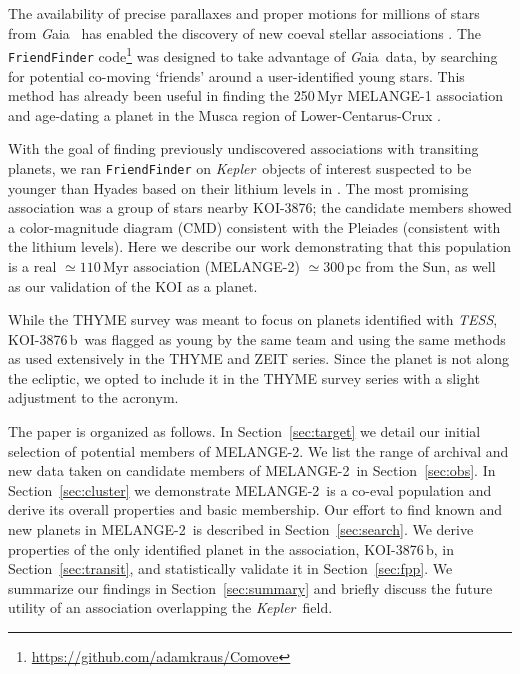\documentclass[twocolumn]{aastex631}
\newcommand{\planetname}{KOI-3876\,b}
\newcommand{\clustername}{MELANGE-2}
\newcommand{\kepler}{{\it Kepler}}
\newcommand{\tess}{\textit{TESS}}
\newcommand{\gaia}{{\textit Gaia}}
\newcommand{\association}{MELANGE-2}
\begin{document}
The availability of precise parallaxes and proper motions for millions of stars from \gaia\ \citep{Gaia_mission2016, GaiaEDR3} has enabled the discovery of new coeval stellar associations \citep[e.g.,][]{2019A&A...622L..13M, 2021arXiv210509338K}. The \texttt{FriendFinder} code\footnote{\url{https://github.com/adamkraus/Comove}} \citep{THYMEV} was designed to take advantage of \gaia\ data, by searching for potential co-moving `friends' around a user-identified young stars. This method has already been useful in finding the 250\,Myr MELANGE-1 association \citep{THYMEV} and age-dating a planet in the Musca region of Lower-Centarus-Crux \citep{2021arXiv211009531M}. 

With the goal of finding previously undiscovered associations with transiting planets, we ran \texttt{FriendFinder} on \kepler\ objects of interest suspected to be younger than Hyades based on their lithium levels in \citet{2018ApJ...855..115B}. The most promising association was a group of stars nearby KOI-3876; the candidate members showed a color-magnitude diagram (CMD) consistent with the Pleiades (consistent with the lithium levels). Here we describe our work demonstrating that this population is a real $\simeq 110$\,Myr association (\association) $\simeq$300\,pc from the Sun, as well as our validation of the KOI as a planet. 

While the THYME survey was meant to focus on planets identified with \tess, \planetname\ was flagged as young by the same team and using the same methods as used extensively in the THYME and ZEIT series. Since the planet is not along the ecliptic, we opted to include it in the THYME survey series with a slight adjustment to the acronym. 

The paper is organized as follows. In Section~\ref{sec:target} we detail our initial selection of potential members of \clustername. We list the range of archival and new data taken on candidate members of \clustername\ in Section~\ref{sec:obs}. In Section~\ref{sec:cluster} we demonstrate \clustername\ is a co-eval population and derive its overall properties and basic membership. Our effort to find known and new planets in \clustername\ is described in Section~\ref{sec:search}. We derive properties of the only identified planet in the association, \planetname, in Section~\ref{sec:transit}, and statistically validate it in Section~\ref{sec:fpp}. We summarize our findings in Section~\ref{sec:summary} and briefly discuss the future utility of an association overlapping the \kepler\ field. 
\end{document}
